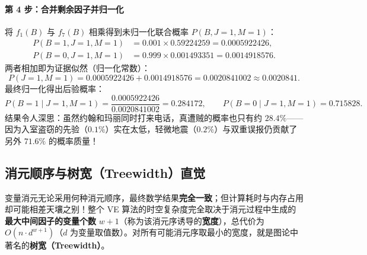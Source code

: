 \paragraph{第 4 步：合并剩余因子并归一化}
将 $f_1(B)$ 与 $f_7(B)$ 相乘得到未归一化联合概率 $P(B, J=1, M=1)$：
\begin{align*}
  P(B=1, J=1, M=1) &= 0.001 \times 0.59224259 = 0.0005922426, \\
  P(B=0, J=1, M=1) &= 0.999 \times 0.001493351 = 0.0014918576.
\end{align*}
两者相加即为证据似然（归一化常数）：
\[
  P(J=1, M=1) = 0.0005922426 + 0.0014918576 = 0.0020841002 \approx \mathbf{0.0020841}.
\]
最终归一化得出后验概率：
\[
  P(B=1 \mid J=1, M=1) = \frac{0.0005922426}{0.0020841002} = \mathbf{0.284172}, \qquad
  P(B=0 \mid J=1, M=1) = \mathbf{0.715828}.
\]
结果令人深思：虽然约翰和玛丽同时打来电话，真遭贼的概率也只有约 $28.4\%$——因为入室盗窃的先验（$0.1\%$）实在太低，轻微地震（$0.2\%$）与双重误报仍贡献了另外 $71.6\%$ 的概率质量！

\subsection{消元顺序与树宽（Treewidth）直觉}

变量消元无论采用何种消元顺序，最终数学结果\textbf{完全一致}；但计算耗时与内存占用却可能相差天壤之别！整个 VE 算法的时空复杂度完全取决于消元过程中生成的\textbf{最大中间因子的变量个数} $w+1$（称为该消元序诱导的\textbf{宽度}），总代价为 $O(n \cdot d^{w+1})$（$d$ 为变量取值数）。对所有可能消元序取最小的宽度，就是图论中著名的\textbf{树宽（Treewidth）}。

